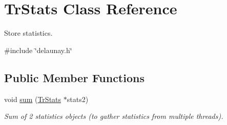 \hypertarget{classTrStats}{
\section{TrStats Class Reference}
\label{classTrStats}
}


Store statistics.  




{\ttfamily \#include \char`\"{}delaunay.h\char`\"{}}

\subsection*{Public Member Functions}
\begin{DoxyCompactItemize}
\item 
void \hyperlink{classTrStats_adc078942b91e4940d7cd479ad141c7b5}{sum} (\hyperlink{classTrStats}{TrStats} $\ast$stats2)
\begin{DoxyCompactList}\small\item\em Sum of 2 statistics objects (to gather statistics from multiple threads). \item\end{DoxyCompactList}\end{DoxyCompactItemize}
